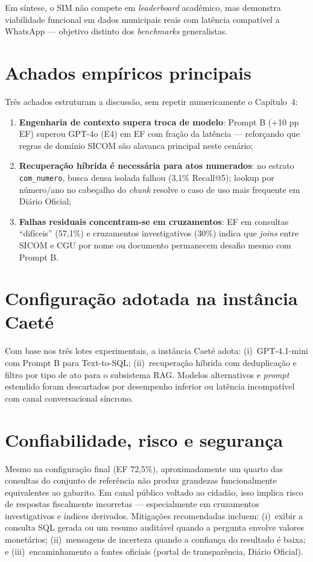 Em síntese, o SIM não compete em \textit{leaderboard} acadêmico, mas demonstra viabilidade funcional em dados municipais reais com latência compatível a WhatsApp --- objetivo distinto dos \textit{benchmarks} generalistas.

\section{Achados empíricos principais}

Três achados estruturam a discussão, sem repetir numericamente o Capítulo~4:

\begin{enumerate}
    \item \textbf{Engenharia de contexto supera troca de modelo}: Prompt B (+10 pp EF) superou GPT-4o (E4) em EF com fração da latência --- reforçando que regras de domínio SICOM são alavanca principal neste cenário;
    \item \textbf{Recuperação híbrida é necessária para atos numerados}: no estrato \texttt{com\_numero}, busca densa isolada falhou (3,1\% Recall@5); lookup por número/ano no cabeçalho do \textit{chunk} resolve o caso de uso mais frequente em Diário Oficial;
    \item \textbf{Falhas residuais concentram-se em cruzamentos}: EF em consultas ``difíceis'' (57,1\%) e cruzamentos investigativos (30\%) indica que \textit{joins} entre SICOM e CGU por nome ou documento permanecem desafio mesmo com Prompt B.
\end{enumerate}

\section{Configuração adotada na instância Caeté}

Com base nos três lotes experimentais, a instância Caeté adota: (i)~GPT-4.1-mini com Prompt B para Text-to-SQL; (ii)~recuperação híbrida com deduplicação e filtro por tipo de ato para o subsistema RAG. Modelos alternativos e \textit{prompt} estendido foram descartados por desempenho inferior ou latência incompatível com canal conversacional síncrono.

\section{Confiabilidade, risco e segurança}

Mesmo na configuração final (EF 72,5\%), aproximadamente um quarto das consultas do conjunto de referência não produz grandezas funcionalmente equivalentes ao gabarito. Em canal público voltado ao cidadão, isso implica risco de respostas fiscalmente incorretas --- especialmente em cruzamentos investigativos e índices derivados. Mitigações recomendadas incluem: (i)~exibir a consulta SQL gerada ou um resumo auditável quando a pergunta envolve valores monetários; (ii)~mensagens de incerteza quando a confiança do resultado é baixa; e (iii)~encaminhamento a fontes oficiais (portal de transparência, Diário Oficial).

